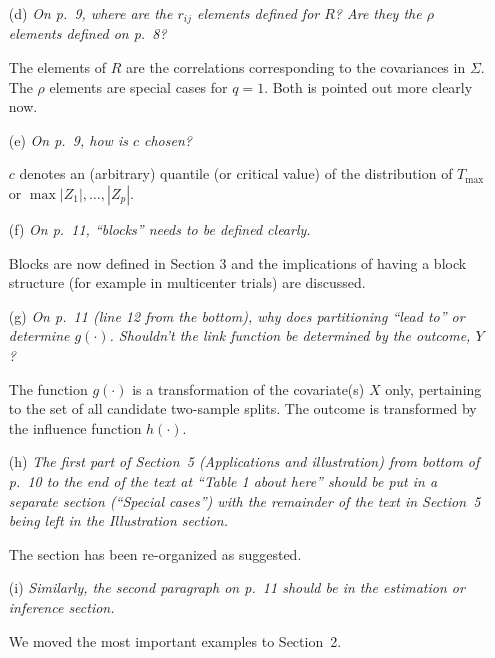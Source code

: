 \documentclass[11pt,a4paper]{article}
\begin{document}
\begin{enumerate}
\begin{itemize}
    \item[(d)] \textit{On p.~9, where are the $r_{ij}$ elements defined for $R$? Are
               they the $\rho$ elements defined on p.~8?}
    
               The elements of $R$ are the correlations corresponding to the covariances
	       in $\Sigma$. The $\rho$ elements are special cases for $q = 1$.
	       Both is pointed out more clearly now.

    \item[(e)] \textit{On p.~9, how is $c$ chosen?}
    
               $c$ denotes an (arbitrary) quantile (or critical value) of the distribution
	       of $T_{\max}$ or $\max  |Z_1|, \dots, |Z_p|$.
	       
    \item[(f)] \textit{On p.~11, ``blocks'' needs to be defined clearly.}
               
	       Blocks are now defined in Section 3 and the implications
               of having a block structure (for example in multicenter trials) 
               are discussed.
               
	       
    \item[(g)] \textit{On p.~11 (line 12 from the bottom), why does partitioning 
               ``lead to'' or determine $g(\cdot)$. Shouldn't the link function be
	       determined by the outcome, $Y$?}
	       
	       The function $g(\cdot)$ is a transformation of the covariate(s) $X$
	       only, pertaining to the set of all candidate two-sample splits.
	       The outcome is transformed by the influence function $h(\cdot)$.
	       
    \item[(h)] \textit{The first part of Section~5 (Applications and illustration)
               from bottom of p.~10 to the end of the text at ``Table 1 about here''
	       should be put in a separate section (``Special cases'') with the
	       remainder of the text in Section~5 being left in the Illustration
	       section.}
	       
	       The section has been re-organized as suggested.
	       
    \item[(i)] \textit{Similarly, the second paragraph on p.~11 should be in the
               estimation or inference section.}
	       
	       We moved the most important examples to Section~2.
	       

\end{itemize}
\end{enumerate}
\end{document}
